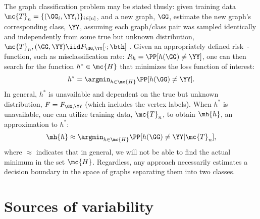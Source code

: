 \documentclass[10pt,journal,cspaper,compsoc]{IEEEtran}
\begin{document}
The graph classification problem may be stated thusly: given training data $\mc{T}_n=\{(\GG_i,\YY_i)\}_{i \in [n]}$, and a new graph, $\GG$, estimate the new graph's corresponding class, $\YY$, assuming each graph/class pair was sampled identically and independently from some true but unknown distribution, $\mc{T}_n,(\GG,\YY) \iid F_{\GG,\YY}[\cdot; \bth]$ .  Given an appropriately defined risk -function, such as misclassification rate: $R_h=\PP[h(\GG) \neq \YY]$, one can then search for the function $h^* \in \mc{H}$ that minimizes the loss function of interest:
\begin{align}
	h^* = \argmin_{h \in \mc{H}} \PP[h(\GG) \neq \YY].
\end{align}
In general, $h^*$ is unavailable and dependent on the true but unknown distribution,  $F=F_{\GG,\YY}$ (which includes the vertex labels).  When $h^*$ is unavailable, one can utilize training data, $\mc{T}_n$, to obtain $\mh{h}$, an approximation to $h^*$:
\begin{align}
	\mh{h} \approx \argmin_{h \in \mc{H}} \PP[h(\GG) \neq \YY | \mc{T}_n],
\end{align}
where $\approx$ indicates that in general, we will not be able to find the actual minimum in the set $\mc{H}$. Regardless, any approach necessarily estimates a decision boundary in the space of graphs separating them into two classes.  %




\section{Sources of variability}
\end{document}
